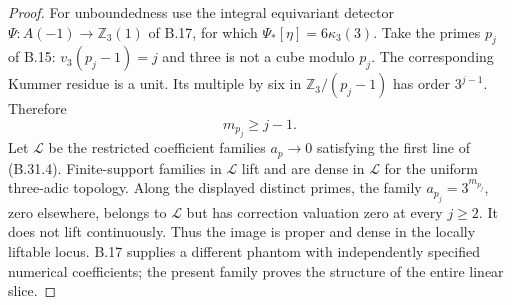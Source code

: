 \begin{proof}
For unboundedness use the integral equivariant detector
$\Psi:A(-1)\to\mathbb Z_3(1)$ of B.17, for which
$\Psi_*[\eta]=6\kappa_3(3)$.
Take the primes $p_j$ of B.15:
$v_3(p_j-1)=j$ and three is not a cube modulo $p_j$.
The corresponding Kummer residue is a unit. Its multiple
by six in $\mathbb Z_3/(p_j-1)$ has order $3^{j-1}$.
Therefore
\[
                         m_{p_j}\ge j-1.                      \tag{B.31.10}
\]
Let $\mathcal L$ be the restricted coefficient families
$a_p\to0$ satisfying the first line of (B.31.4).
Finite-support families in $\mathcal L$ lift and are
dense in $\mathcal L$ for the uniform three-adic topology.
Along the displayed distinct primes, the family
$a_{p_j}=3^{m_{p_j}}$, zero elsewhere, belongs to
$\mathcal L$ but has correction valuation zero at every
$j\ge2$. It does not lift continuously. Thus the image
is proper and dense in the locally liftable locus.
B.17 supplies a different phantom with independently
specified numerical coefficients; the present family
proves the structure of the entire linear slice.
\end{proof}


